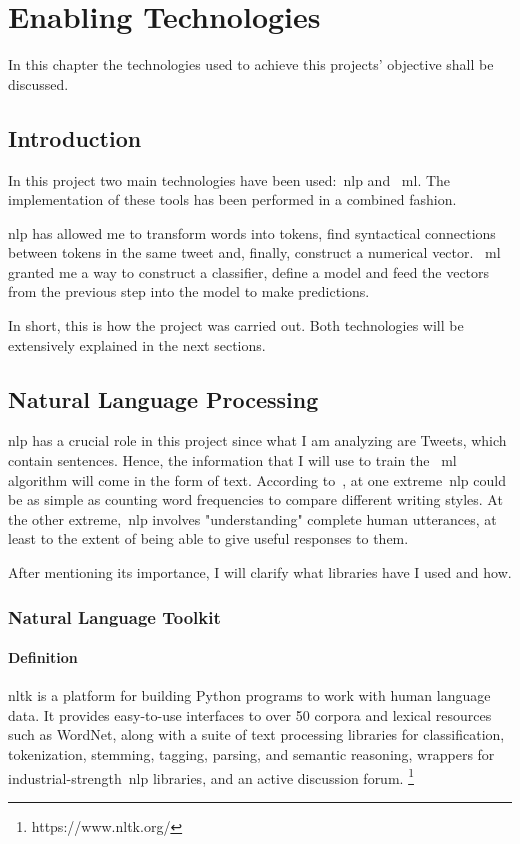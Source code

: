 	\chapter{Enabling Technologies}
\label{chap:architecture}

\label{sec:introduction}
In this chapter the technologies used to achieve this projects' objective shall be discussed.

\section{Introduction}\par
{}
In this project two main technologies have been used:~\ac{nlp}  and ~\ac{ml}. The implementation of these tools has been performed in a combined fashion. \par
\ac{nlp} has allowed me to transform words into tokens, find syntactical connections between tokens in the same tweet and, finally, construct a numerical vector. ~\ac{ml} granted me a way to construct a classifier, define a model and feed the vectors from the previous step into the model to make predictions.\par
In short, this is how the project was carried out. Both technologies will be extensively explained in the next sections.

\section{Natural Language Processing}
\ac{nlp} has a crucial role in this project since what I am analyzing are Tweets, which contain sentences. Hence, the information that I will use to train the ~\ac{ml} algorithm will come in the form of text. According to~\cite{bird2009natural}, at one extreme~\ac{nlp} could be as simple as counting word frequencies to compare different writing styles. At the other extreme,~\ac{nlp} involves "understanding" complete human utterances, at least to the extent of being able to give useful responses to them.\par
After mentioning its importance, I will clarify what libraries have I used and how.
\label{sec:NLP}
\subsection{Natural Language Toolkit}
\subsubsection{Definition}
\ac{nltk} is a platform for building Python programs to work with human language data. It provides easy-to-use interfaces to over 50 corpora and lexical resources such as WordNet, along with a suite of text processing libraries for classification, tokenization, stemming, tagging, parsing, and semantic reasoning, wrappers for industrial-strength~\ac{nlp} libraries, and an active discussion forum. \footnote{https://www.nltk.org/}
